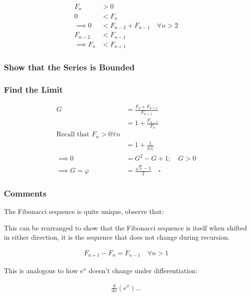 \documentclass[a4paper,11pt,twoside]{article}
\begin{document}
$$\begin{aligned}
F_{n} &> 0 \\
0 &< F_{n} \\
 \implies   0 &< F_{n - 2} +  F_{n- 1} \quad \forall n > 2 \\
  F_{n- 2} &< F_{n- 1}  \\
   \implies  F_n & < F_{n+1}
\end{aligned}$$



\subsubsection{Show that the Series is Bounded}
\label{sec:orgc713089}
\subsubsection{Find the Limit}
\label{sec:orgef18c2d}
$$\begin{aligned}
G &= \frac{F_{n} +  F_{n+  1} }{F_{n+  1} } \\
&= 1 +  \frac{F_{n- 1} }{F_n} \\
\text{Recall that $F_n > 0 \forall n$}\\
&=  1 +  \frac{1}{    \left\lvert G \right\rvert } \\
 \implies  0 &= G^2- G +  1; \quad G > 0  \\
  \implies  G = \varphi &=  \frac{\sqrt{5} - 1  }{2} \quad  \square
\end{aligned}$$


\subsubsection{Comments}
\label{sec:org4baeea5}

The Fibonacci sequence is quite unique, observe that:

This can be rearranged to show that the Fibonacci sequence is itself
when shifted in either direction, it is the sequence that does not
change during recursion.

\[\begin{aligned}
F_{n+ 1} - F_{n} = F_{n- 1} \quad \forall n > 1
\end{aligned}\]

This is analogous to how \(e^x\) doesn't change under differentiation:

$$\begin{aligned}
\frac{\mathrm{d} }{\mathrm{d} x}\left( e^x \right) \ldots
\end{aligned}$$
\end{document}
